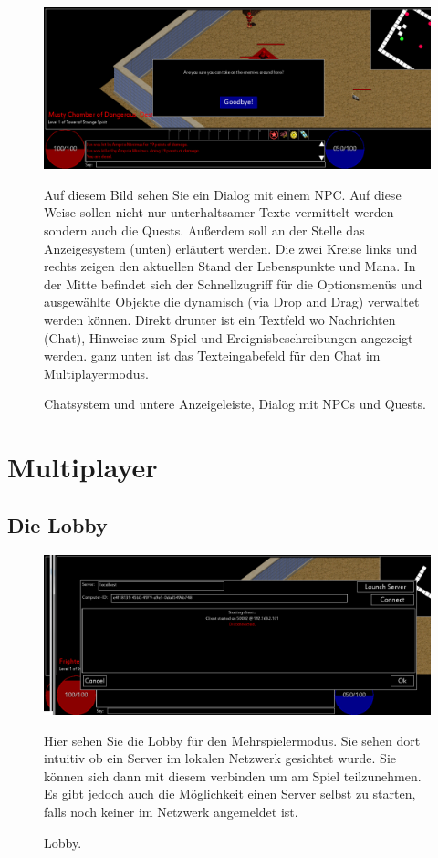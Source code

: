 \documentclass[12pt, a4paper]{scrreprt}
\begin{document}
\begin{figure}[h]
\includegraphics[width=\textwidth]{img/dialog_with_NPC}
\label{fig:chat}
\caption{Chatsystem und untere Anzeigeleiste, Dialog mit NPCs und Quests.}
\vspace{1cm}
Auf diesem Bild sehen Sie ein Dialog mit einem NPC. Auf diese Weise sollen nicht nur unterhaltsamer Texte vermittelt werden sondern auch die Quests. Außerdem soll an der Stelle das Anzeigesystem (unten) erläutert werden. Die zwei Kreise links und rechts zeigen den aktuellen Stand der Lebenspunkte und Mana. In der Mitte befindet sich der Schnellzugriff für die Optionsmenüs und ausgewählte Objekte die dynamisch (via Drop and Drag) verwaltet werden können. Direkt drunter ist ein Textfeld wo Nachrichten (Chat), Hinweise zum Spiel und Ereignisbeschreibungen angezeigt werden. ganz unten ist das Texteingabefeld für den Chat im Multiplayermodus.
\end{figure}
\chapter{Multiplayer}
\section{Die Lobby}
\begin{figure}[h]
\includegraphics[width=\textwidth]{img/multiplayer}
\caption{Lobby.}
\vspace{1cm}
Hier sehen Sie die Lobby für den Mehrspielermodus. Sie sehen dort intuitiv ob ein Server im lokalen Netzwerk gesichtet wurde. Sie können sich dann mit diesem verbinden um am Spiel teilzunehmen. Es gibt jedoch auch die Möglichkeit einen Server selbst zu starten, falls noch keiner im Netzwerk angemeldet ist.
\end{figure}
\end{document}
